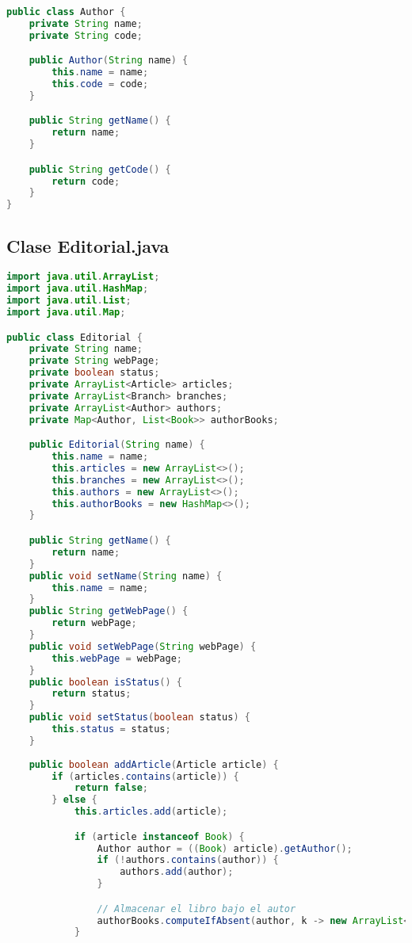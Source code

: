 \documentclass{article}
\begin{document}
\begin{itemize}
        \begin{lstlisting}[language=java]
public class Author {
    private String name;
    private String code;

    public Author(String name) {
        this.name = name;
        this.code = code;
    }

    public String getName() {
        return name;
    }

    public String getCode() {
        return code;
    }
}
        \end{lstlisting}

        \subsection{Clase Editorial.java}

        \begin{lstlisting}[language=java]
import java.util.ArrayList;
import java.util.HashMap;
import java.util.List;
import java.util.Map;

public class Editorial {
	private String name;
    private String webPage;
    private boolean status;
    private ArrayList<Article> articles;
    private ArrayList<Branch> branches;
    private ArrayList<Author> authors;
    private Map<Author, List<Book>> authorBooks;

	public Editorial(String name) {
        this.name = name;
        this.articles = new ArrayList<>();
        this.branches = new ArrayList<>();
        this.authors = new ArrayList<>();
        this.authorBooks = new HashMap<>();
    }

	public String getName() {
		return name;
	}
	public void setName(String name) {
		this.name = name;
	}
	public String getWebPage() {
		return webPage;
	}
	public void setWebPage(String webPage) {
		this.webPage = webPage;
	}
	public boolean isStatus() {
		return status;
	}
	public void setStatus(boolean status) {
		this.status = status;
	}
	
	public boolean addArticle(Article article) {
        if (articles.contains(article)) {
            return false;
        } else {
            this.articles.add(article);

            if (article instanceof Book) {
                Author author = ((Book) article).getAuthor();
                if (!authors.contains(author)) {
                    authors.add(author);
                }

                // Almacenar el libro bajo el autor
                authorBooks.computeIfAbsent(author, k -> new ArrayList<>()).add((Book) article);
            }


\end{lstlisting}
\end{itemize}
\end{document}

